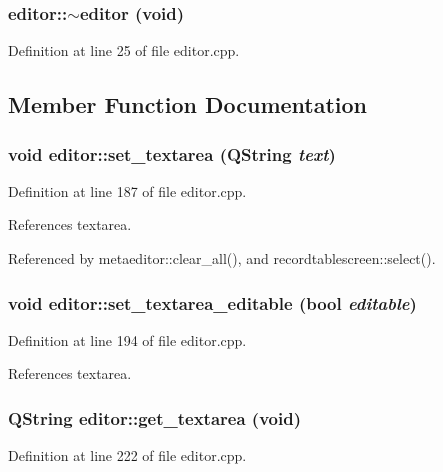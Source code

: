 \subsubsection{\setlength{\rightskip}{0pt plus 5cm}editor::$\sim$editor (void)}\label{classeditor_79ad38324605307813b62f8db6aa3c1e}




Definition at line 25 of file editor.cpp.

\subsection{Member Function Documentation}
\subsubsection{\setlength{\rightskip}{0pt plus 5cm}void editor::set\_\-textarea (QString {\em text})}\label{classeditor_f106cccf403b250d3356757f8c2e00b3}




Definition at line 187 of file editor.cpp.

References textarea.

Referenced by metaeditor::clear\_\-all(), and recordtablescreen::select().
\subsubsection{\setlength{\rightskip}{0pt plus 5cm}void editor::set\_\-textarea\_\-editable (bool {\em editable})}\label{classeditor_5f319c5f3e4c72967401e1f2bc68e416}




Definition at line 194 of file editor.cpp.

References textarea.
\subsubsection{\setlength{\rightskip}{0pt plus 5cm}QString editor::get\_\-textarea (void)}\label{classeditor_70e34d0e46bb865b58303fe86e6bfea6}




Definition at line 222 of file editor.cpp.

